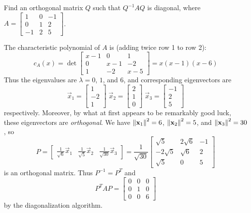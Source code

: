 \documentclass{ximera}
\begin{document}
\begin{example}\label{ex:DiagonalizeSymmetricMatrix}
Find an orthogonal matrix $Q$ such that $Q^{-1}AQ$ is diagonal, where $A = \begin{bmatrix}
1 & 0 & -1 \\
0 & 1 & 2 \\
-1 & 2 & 5
\end{bmatrix}$.

\begin{explanation}
 The characteristic polynomial of $A$ is (adding twice row 1 to row 2):
\begin{equation*}
c_{A}(x) = \det \begin{bmatrix}
x - 1 & 0 & 1 \\
0 & x - 1 & -2 \\
1 & -2 & x - 5
\end{bmatrix} = x(x - 1)(x - 6)
\end{equation*}
Thus the eigenvalues are $\lambda = 0$, $1$, and $6$, and corresponding eigenvectors are
\begin{equation*}
\vec{x}_{1} = \begin{bmatrix}
1 \\
-2 \\
1
\end{bmatrix} \;
\vec{x}_{2} = \begin{bmatrix}
2 \\
1 \\
0
\end{bmatrix} \;
\vec{x}_{3} = \begin{bmatrix}
-1 \\
2 \\
5
\end{bmatrix}
\end{equation*}
respectively. Moreover, by what at first appears to be remarkably good luck, these eigenvectors are \textit{orthogonal}. We have $\left\lVert\mathbf{x}_{1}\right\rVert^{2} = 6$, $\left\lVert\mathbf{x}_{2}\right\rVert^{2} = 5$, and $\left\lVert\mathbf{x}_{3}\right\rVert^{2} = 30$, so
\begin{equation*}
P = \begin{bmatrix}
\frac{1}{\sqrt{6}}\vec{x}_{1} & \frac{1}{\sqrt{5}}\vec{x}_{2} & \frac{1}{\sqrt{30}}\vec{x}_{3}
\end{bmatrix} = \frac{1}{\sqrt{30}} \begin{bmatrix}
\sqrt{5} & 2\sqrt{6} & -1 \\
-2\sqrt{5} & \sqrt{6} & 2 \\
\sqrt{5} & 0 & 5
\end{bmatrix}
\end{equation*}
is an orthogonal matrix. Thus $P^{-1} = P^{T}$ and
\begin{equation*}
P^TAP = \begin{bmatrix}
0 & 0 & 0 \\
0 & 1 & 0 \\
0 & 0 & 6
\end{bmatrix}
\end{equation*}
by the diagonalization algorithm.
\end{explanation}
\end{example}
\end{document}
